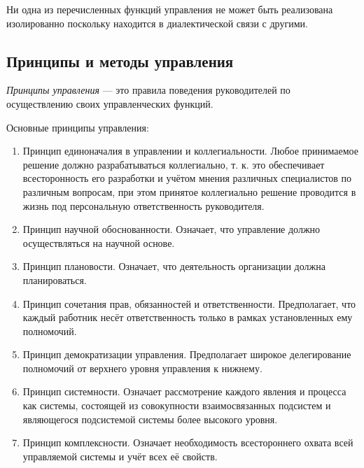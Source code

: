 \documentclass[12pt, russian, oneside, article]{ncc}
\begin{document}
Ни одна из перечисленных функций управления не может быть реализована изолированно поскольку находится в диалектической связи с другими.
\subsection{Принципы и методы управления}
\label{sec-1_2}


\emph{Принципы управления} --- это правила поведения руководителей по осуществлению своих управленческих функций.

Основные принципы управления:
\begin{enumerate}
\item Принцип единоначалия в управлении и коллегиальности. Любое принимаемое решение должно разрабатываться коллегиально, т. к. это обеспечивает всесторонность его разработки и учётом мнения различных специалистов по различным вопросам, при этом принятое коллегиально решение проводится в жизнь под персональную ответственность руководителя.
\item Принцип научной обоснованности. Означает, что управление должно осуществляться на научной основе.
\item Принцип плановости. Означает, что деятельность организации должна планироваться.
\item Принцип сочетания прав, обязанностей и ответственности. Предполагает, что каждый работник несёт ответственность только в рамках установленных ему полномочий.
\item Принцип демократизации управления. Предполагает широкое делегирование полномочий от верхнего уровня управления к нижнему.
\item Принцип системности. Означает рассмотрение каждого явления и процесса как системы, состоящей из совокупности взаимосвязанных подсистем и являющегося подсистемой системы более высокого уровня.
\item Принцип комплексности. Означает необходимость всестороннего охвата всей управляемой системы и учёт всех её свойств.
\end{enumerate}
\end{document}
